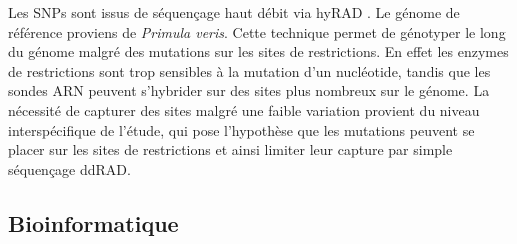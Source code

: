 Les SNPs sont issus de séquençage haut débit via hyRAD \citep{Suchan2016}. 
Le génome de référence proviens de \textit{Primula veris}.
Cette technique permet de génotyper le long du génome malgré des mutations sur les sites de restrictions. 
En effet les enzymes de restrictions sont trop sensibles à la mutation d'un nucléotide, tandis que les sondes ARN peuvent s'hybrider sur des sites plus nombreux sur le génome. 
La nécessité de capturer des sites malgré une faible variation provient du niveau interspécifique de l'étude, qui pose l'hypothèse que les mutations peuvent se placer sur les sites de restrictions et ainsi limiter leur capture par simple séquençage ddRAD.

\subsection{Bioinformatique}

